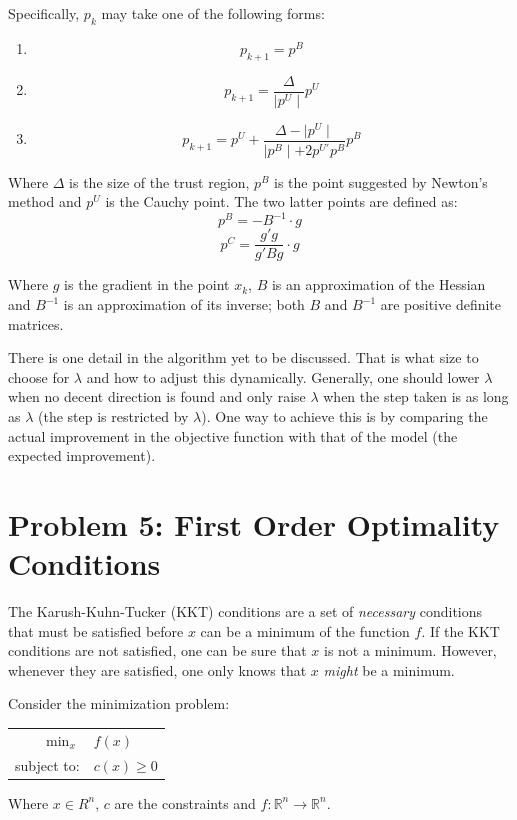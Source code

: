 \documentclass[10pt,oneside,a4paper,final,english]{memoir}
\begin{document}
Specifically, $p_k$ may take one of the following forms:
\begin{enumerate}
\item \[ p_{k+1} = p^B \]
\item \[ p_{k+1} = \frac{\Delta}{\mid p^U\mid}  p^U \]
\item \[ p_{k+1} = p^U + \frac{\Delta - \mid p^U\mid}{
    \mid p^B\mid + 2p^{U\prime} p^B} p^B \]
\end{enumerate}


Where $\Delta$ is the size of the trust region, $p^B$ is the point
suggested by Newton's method and $p^U$ is the Cauchy point. The two
latter points are defined as:
\[ p^B = -B^{-1} \cdot g \]
\[ p^C = \frac{g' g}{g'Bg} \cdot g \]

Where $g$ is the gradient in the point $x_k$, $B$ is an approximation
of the Hessian and $B^{-1}$ is an approximation of its inverse; both
$B$ and $B^{-1}$ are positive definite matrices.

There is one detail in the algorithm yet to be discussed. That is what
size to choose for $\lambda$ and how to adjust this
dynamically. Generally, one should lower $\lambda$ when no decent
direction is found and only raise $\lambda$ when the step taken is as
long as $\lambda$ (the step is restricted by $\lambda$). One way to
achieve this is by comparing the actual improvement in the objective
function with that of the model (the expected improvement).


\section{Problem 5: First Order Optimality Conditions}
The Karush-Kuhn-Tucker (KKT) conditions are a set of \textit{necessary}
conditions that must be satisfied before $x$ can be a minimum of
the function $f$. If the KKT conditions are not satisfied, one can
be sure that $x$ is not a minimum. However, whenever they are
satisfied, one only knows that $x$ \textit{might} be a minimum.

Consider the minimization problem:\\
\begin{center}\begin{tabular}{rl}
$\min_{x}$ & $f(x)$ \\
subject to: & $c(x) \geq 0$
\end{tabular}\end{center}

Where $x \in R^n$, $c$ are the constraints and $f : \mathbb{R}^n
\rightarrow \mathbb{R}^n$.
\end{document}
